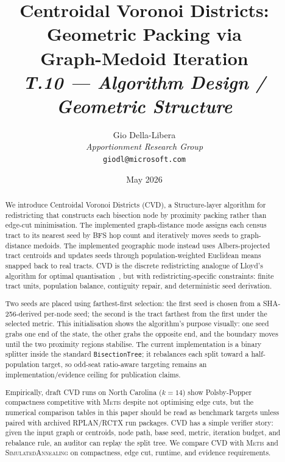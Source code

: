 \documentclass[12pt]{article}
\title{%
  \textbf{Centroidal Voronoi Districts: Geometric Packing via}\\
  \textbf{Graph-Medoid Iteration}\\[0.8em]
  \normalsize\textit{T.10 --- Algorithm Design / Geometric Structure}%
}
\author{%
  Gio Della-Libera\\
  \textit{Apportionment Research Group}\\
  \small\texttt{giodl@microsoft.com}
}
\date{May 2026}
\newcommand{\cvd}{\textsc{CVD}}
\newcommand{\metis}{\textsc{Metis}}
\newcommand{\sa}{\textsc{SimulatedAnnealing}}
\begin{document}
\maketitle

\begin{abstract}
\noindent
We introduce Centroidal Voronoi Districts (\cvd{}), a Structure-layer
algorithm for redistricting that constructs each bisection node by proximity
packing rather than edge-cut minimisation.
The implemented graph-distance mode assigns each census tract to its nearest
seed by BFS hop count and iteratively moves seeds to graph-distance medoids.
The implemented geographic mode instead uses Albers-projected tract centroids
and updates seeds through population-weighted Euclidean means snapped back to
real tracts.
\cvd{} is the discrete redistricting analogue of Lloyd's algorithm for
optimal quantisation~\citep{lloyd1982}, but with redistricting-specific
constraints: finite tract units, population balance, contiguity repair, and
deterministic seed derivation.

Two seeds are placed using farthest-first selection: the first seed is chosen
from a SHA-256-derived per-node seed; the second is the tract farthest from the
first under the selected metric.
This initialisation shows the algorithm's purpose visually: one seed grabs one
end of the state, the other grabs the opposite end, and the boundary moves
until the two proximity regions stabilise.
The current implementation is a binary splitter inside the standard
\texttt{BisectionTree}; it rebalances each split toward a half-population
target, so odd-seat ratio-aware targeting remains an implementation/evidence
ceiling for publication claims.

Empirically, draft \cvd{} runs on North Carolina ($k=14$) show
Polsby-Popper compactness competitive with \metis{} despite not optimising
edge cuts, but the numerical comparison tables in this paper should be read
as benchmark targets unless paired with archived RPLAN/RCTX run packages.
\cvd{} has a simple verifier story: given the input graph or centroids, node
path, base seed, metric, iteration budget, and rebalance rule, an auditor can
replay the split tree.
We compare \cvd{} with \metis{} and \sa{} on compactness, edge cut, runtime,
and evidence requirements.
\end{abstract}

\tableofcontents
\newpage










\end{document}
